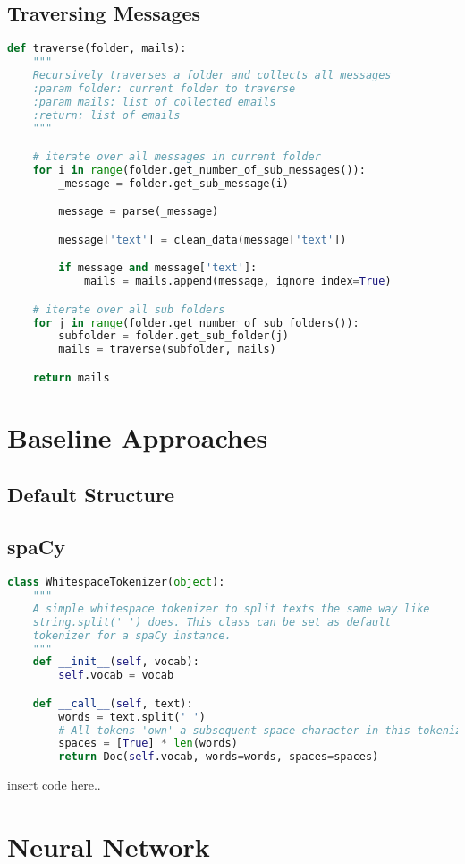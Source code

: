 \subsection{Traversing Messages}

\begin{lstlisting}[language=Python, label={code:traverse}, caption=Recursively traversation of email folders]
def traverse(folder, mails):
    """
    Recursively traverses a folder and collects all messages
    :param folder: current folder to traverse
    :param mails: list of collected emails
    :return: list of emails
    """

    # iterate over all messages in current folder
    for i in range(folder.get_number_of_sub_messages()):
        _message = folder.get_sub_message(i)

        message = parse(_message)

        message['text'] = clean_data(message['text'])

        if message and message['text']:
            mails = mails.append(message, ignore_index=True)

    # iterate over all sub folders
    for j in range(folder.get_number_of_sub_folders()):
        subfolder = folder.get_sub_folder(j)
        mails = traverse(subfolder, mails)

    return mails
\end{lstlisting}

\section{Baseline Approaches}

\subsection{Default Structure}

\subsection{spaCy}

\begin{lstlisting}[language=Python, label={code:tokenizer}, caption=Custom whitespace tokenizer]
class WhitespaceTokenizer(object):
    """
    A simple whitespace tokenizer to split texts the same way like
    string.split(' ') does. This class can be set as default
    tokenizer for a spaCy instance.
    """
    def __init__(self, vocab):
        self.vocab = vocab

    def __call__(self, text):
        words = text.split(' ')
        # All tokens 'own' a subsequent space character in this tokenizer
        spaces = [True] * len(words)
        return Doc(self.vocab, words=words, spaces=spaces)
\end{lstlisting}

insert code here..

\section{Neural Network}
